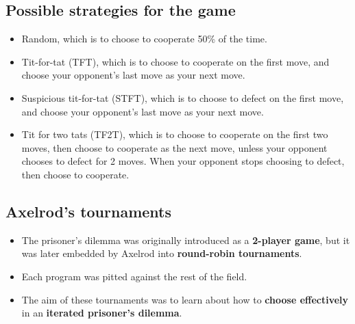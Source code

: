 \documentclass[11pt]{article}
\begin{document}
\subsection{Possible strategies for the game}
\label{sec:orge32b810}
\begin{itemize}
\item Random, which is to choose to cooperate 50\% of the time.
\item Tit-for-tat (TFT), which is to choose to cooperate on the first move, and choose your opponent's last move as your next move.
\item Suspicious tit-for-tat (STFT), which is to choose to defect on the first move, and choose your opponent's last move as your next move.
\item Tit for two tats (TF2T), which is to choose to cooperate on the first two moves, then choose to cooperate as the next move, unless your opponent chooses to defect for 2 moves. When your opponent stops choosing to defect, then choose to cooperate.
\end{itemize}
\subsection{Axelrod's tournaments}
\label{sec:orgd516ed4}
\begin{itemize}
\item The prisoner's dilemma was originally introduced as a \textbf{2-player game}, but it was later embedded by Axelrod into \textbf{round-robin tournaments}.
\item Each program was pitted against the rest of the field.
\item The aim of these tournaments was to learn about how to \textbf{choose effectively} in an \textbf{iterated prisoner's dilemma}.
\end{itemize}
\end{document}
